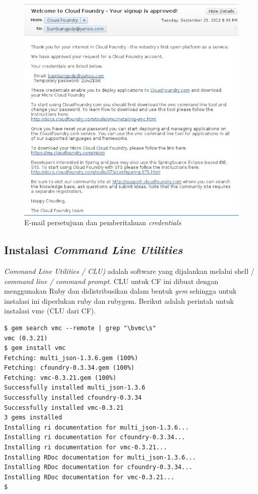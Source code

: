   \begin{figure}[t]
    \begin{center}
      \includegraphics[scale=0.5]{images/cf-signup-approved.jpg}
    \end{center}
    \caption{E-mail persetujuan dan pemberitahuan \textit{credentials}}
    \label{fig:cfsignupapproved}
  \end{figure}

\subsection{Instalasi \textit{Command Line Utilities}}

\textit{Command Line Utilities / CLU)} adalah software yang dijalankan melalui shell / \textit{command line / command prompt}. CLU untuk CF ini dibuat dengan menggunakan Ruby dan didistribusikan dalam bentuk \textit{gem} sehingga untuk instalasi ini diperlukan ruby dan rubygem. Berikut adalah perintah untuk instalasi vmc (CLU dari CF).

\lstset{language=bash,caption=Instalasi vmc}
\begin{lstlisting}
$ gem search vmc --remote | grep "\bvmc\s" 
vmc (0.3.21) 
$ gem install vmc 
Fetching: multi_json-1.3.6.gem (100%) 
Fetching: cfoundry-0.3.34.gem (100%) 
Fetching: vmc-0.3.21.gem (100%) 
Successfully installed multi_json-1.3.6 
Successfully installed cfoundry-0.3.34 
Successfully installed vmc-0.3.21 
3 gems installed 
Installing ri documentation for multi_json-1.3.6... 
Installing ri documentation for cfoundry-0.3.34... 
Installing ri documentation for vmc-0.3.21... 
Installing RDoc documentation for multi_json-1.3.6... 
Installing RDoc documentation for cfoundry-0.3.34... 
Installing RDoc documentation for vmc-0.3.21... 
$
\end{lstlisting}

